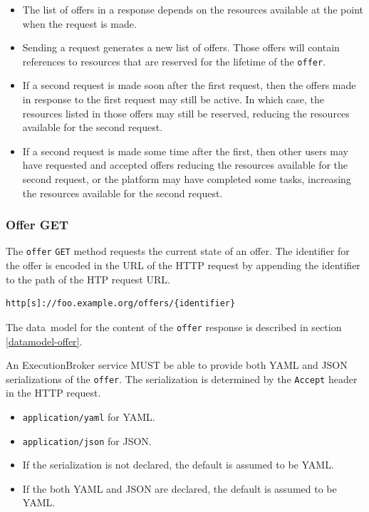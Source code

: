\documentclass[11pt,a4paper]{ivoa}
\newcommand{\json} {JSON}
\newcommand{\yaml} {YAML}
\newcommand{\datamodel} {data~model}
\newcommand{\execbrokerclass} {ExecutionBroker}
\newcommand{\codeword}[1] {\texttt{#1}}
\begin{document}
\begin{itemize}
    \item The list of offers in a response depends on the resources available at the point when the request is made.
    \item Sending a request generates a new list of offers.
    Those offers will contain references to resources that are reserved for the lifetime of the \codeword{offer}.
    \item If a second request is made soon after the first request,
    then the offers made in response to the first request may still be active.
    In which case, the resources listed in those offers may still be reserved,
    reducing the resources available for the second request.
    \item If a second request is made some time after the first, then
    other users may have requested and accepted offers reducing the resources available for the second request,
    or the platform may have completed some tasks, increasing the resources available for the second request.
\end{itemize}

\subsubsection{Offer GET}
\label{execution-planner-offer-get}

The \codeword{offer} \codeword{GET} method requests the current state of an offer.
The identifier for the offer is encoded in the URL of the HTTP request by appending the
identifier to the path of the HTP request URL.

\begin{lstlisting}[]
http[s]://foo.example.org/offers/{identifier}
\end{lstlisting}

The \datamodel{} for the content of the \codeword{offer} response is described in section
\ref{datamodel-offer}.

An \execbrokerclass{} service MUST be able to provide both \yaml{} and \json{} serializations
of the \codeword{offer}.
The serialization is determined by the \codeword{Accept} header in the HTTP request.
\begin{itemize}
    \item \codeword{application/yaml} for \yaml{}.
    \item \codeword{application/json} for \json.
    \item If the serialization is not declared, the default is assumed to be \yaml{}.
    \item If the both \yaml{} and \json{} are declared, the default is assumed to be \yaml{}.
\end{itemize}
\end{document}
